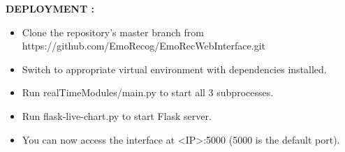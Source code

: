 \documentclass[oneside,a4paper,12pt]{report}
\begin{document}
\begin{normalsize}
\begin{itemize}
\begin{itemize}
	\end{itemize}
\vspace{10mm}
    \textbf{DEPLOYMENT : }
    \begin{itemize}
    	\item Clone the repository's master branch from https://github.com/EmoRecog/EmoRecWebInterface.git
    	\newline
    	\item Switch to appropriate virtual environment with dependencies installed.
    	\newline
    	\item Run realTimeModules/main.py to start all 3 subprocesses.
    	\newline
    	\item Run flask-live-chart.py to start Flask server.
    	\newline
    	\item You can now access the interface at <IP>:5000 (5000 is the default port).
    	\newline
    \end{itemize}   
    
   \end{itemize} 

\end{normalsize}
\end{document}
